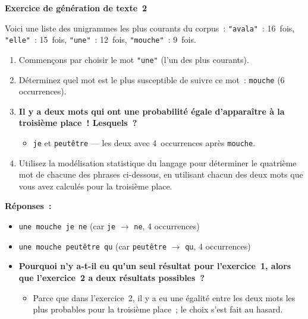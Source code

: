 \documentclass[12pt,a4paper]{article}
\begin{document}
\begin{activitybox}
  \textbf{Exercice de génération de texte~2}

  Voici une liste des unigrammes les plus courants du corpus~: \texttt{"avala"}~: 16~fois, \texttt{"elle"}~: 15~fois, \texttt{"une"}~: 12~fois, \texttt{"mouche"}~: 9~fois.

  \begin{enumerate}[leftmargin=*]
    \item Commençons par choisir le mot \texttt{"une"} (l'un des plus courants).
    \item Déterminez quel mot est le plus susceptible de suivre ce mot~: \texttt{mouche} (6 occurrences).
    \item \textbf{Il y a deux mots qui ont une probabilité égale d'apparaître à la troisième place~! Lesquels~?}
    \begin{itemize}
      \item \texttt{je} et \texttt{peutêtre} — les deux avec 4~occurrences après \texttt{mouche}.
    \end{itemize}
    \item Utilisez la modélisation statistique du langage pour déterminer le quatrième mot de chacune des phrases ci-dessous, en utilisant chacun des deux mots que vous avez calculés pour la troisième place.
  \end{enumerate}

  \textbf{Réponses~:}
  \begin{itemize}
    \item \texttt{une mouche je ne} (car \texttt{je} $\to$ \texttt{ne}, 4 occurrences)
    \item \texttt{une mouche peutêtre qu} (car \texttt{peutêtre} $\to$ \texttt{qu}, 4 occurrences)
  \end{itemize}

  \begin{itemize}
    \item \textbf{Pourquoi n'y a-t-il eu qu'un seul résultat pour l'exercice~1, alors que l'exercice~2 a deux résultats possibles~?}
    \begin{itemize}
      \item Parce que dans l'exercice~2, il y a eu une égalité entre les deux mots les plus probables pour la troisième place~; le choix s'est fait au hasard.
    \end{itemize}
  \end{itemize}
\end{activitybox}
\end{document}
